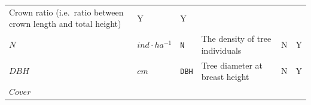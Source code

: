 \documentclass[]{book}
\begin{document}
\begin{longtable}[]{@{}llllll@{}}
\begin{minipage}[t]{0.43\columnwidth}
Crown ratio (i.e.~ratio between crown length and total height)\strut
\end{minipage} & \begin{minipage}[t]{0.07\columnwidth}\raggedright
Y\strut
\end{minipage} & \begin{minipage}[t]{0.07\columnwidth}\raggedright
Y\strut
\end{minipage}\tabularnewline
\begin{minipage}[t]{0.10\columnwidth}\raggedright
\(N\)\strut
\end{minipage} & \begin{minipage}[t]{0.09\columnwidth}\raggedright
\(ind · ha^{-1}\)\strut
\end{minipage} & \begin{minipage}[t]{0.06\columnwidth}\raggedright
\texttt{N}\strut
\end{minipage} & \begin{minipage}[t]{0.43\columnwidth}\raggedright
The density of tree individuals\strut
\end{minipage} & \begin{minipage}[t]{0.07\columnwidth}\raggedright
N\strut
\end{minipage} & \begin{minipage}[t]{0.07\columnwidth}\raggedright
Y\strut
\end{minipage}\tabularnewline
\begin{minipage}[t]{0.10\columnwidth}\raggedright
\(DBH\)\strut
\end{minipage} & \begin{minipage}[t]{0.09\columnwidth}\raggedright
\(cm\)\strut
\end{minipage} & \begin{minipage}[t]{0.06\columnwidth}\raggedright
\texttt{DBH}\strut
\end{minipage} & \begin{minipage}[t]{0.43\columnwidth}\raggedright
Tree diameter at breast height\strut
\end{minipage} & \begin{minipage}[t]{0.07\columnwidth}\raggedright
N\strut
\end{minipage} & \begin{minipage}[t]{0.07\columnwidth}\raggedright
Y\strut
\end{minipage}\tabularnewline
\begin{minipage}[t]{0.10\columnwidth}\raggedright
\(Cover\)\strut
\end{minipage} & \begin{minipage}[t]{0.09\columnwidth}\raggedright

\end{minipage}
\end{longtable}
\end{document}
